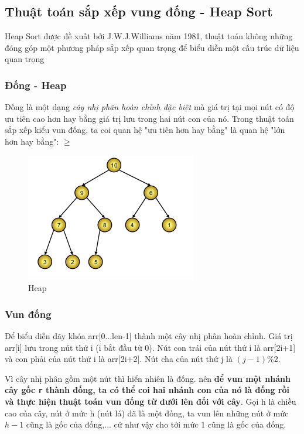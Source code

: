 \documentclass[a4paper]{article}
\begin{document}
\subsection{Thuật toán sắp xếp vung đống - Heap Sort}

Heap Sort được đề xuất bởi J.W.J.Williams năm 1981, thuật toán không những đóng góp một phương pháp sắp xếp quan trọng để biểu diễn một cấu trúc dữ liệu quan trọng 
\pagebreak
\subsubsection{Đống - Heap}
Đống là một dạng \emph{cây nhị phân hoàn chỉnh đặc biệt} mà giá trị tại mọi nút có độ ưu tiên cao hơn hay bằng giá trị lưu trong hai nút con của nó. Trong thuật toán sắp xếp kiểu vun đống, ta coi quan hệ "ưu tiên hơn hay bằng" là quan hệ "lớn hơn hay bằng": $ \ge $

\begin{figure}[htb]
\centering
\includegraphics[scale=1]{img/heaptree.png}
\caption{Heap}
\label{HeapTree}
\end{figure}

\subsubsection{Vun đống}

Để biểu diễn dãy khóa arr[0...len-1] thành một cây nhị phân hoàn chỉnh. Giá trị arr[i] lưu trong nút thứ i (i bắt đầu từ 0). Nút con trái của nút thứ i là arr[2i+1] và con phải của nút thứ i là arr[2i+2]. Nút cha của nút thứ j là $(j-1) \% 2$.

Vì cây nhị phân gồm một nút thì hiển nhiên là đống. nên \textbf{để vun một nhánh cây gốc \texttt{r} thành đống, ta có thể coi hai nhánh con của nó là đống rồi và thực hiện thuật toán vun đống từ dưới lên đối với cây}. Gọi h là chiều cao của cây, nút ở mức h (nút lá) đã là một đống, ta vun lên những nút ở mức $h-1$ cũng là gốc của đống,... cứ như vậy cho tới mức 1 cũng là gốc của đống.
\end{document}
